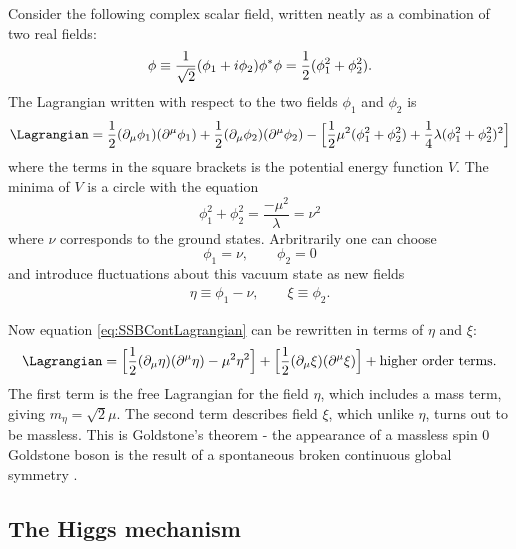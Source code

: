 Consider the following complex scalar field, written neatly as a combination of two real fields:
\begin{equation}
    \phi\equiv\dfrac{1}{\sqrt{2}}(\phi_1+i\phi_2)\\ \label{eq:complexfield}
    \phi^*\phi=\dfrac{1}{2}(\phi^2_1+\phi^2_2).
\end{equation}
The Lagrangian written with respect to the two fields $\phi_1$ and $\phi_2$ is
\begin{equation}\label{eq:SSBContLagrangian}
    \Lagrangian=\dfrac{1}{2}(\partial_{\mu}\phi_1)(\partial^{\mu}\phi_1) + \dfrac{1}{2}(\partial_{\mu}\phi_2)(\partial^{\mu}\phi_2) - \Big[\dfrac{1}{2}\mu^2(\phi_1^2+\phi_2^2)+\dfrac{1}{4}\lambda(\phi_1^2+\phi_2^2)^2\Big]
\end{equation}
where the terms in the square brackets is the potential energy function $V$. The minima of $V$ is a circle with the equation
\begin{equation}
    \phi_1^2+\phi_2^2=\dfrac{-\mu^2}{\lambda}=\nu^2
\end{equation}
where $\nu$ corresponds to the ground states. Arbritrarily one can choose
\begin{equation}
    \phi_1=\nu,\qquad\phi_2=0
\end{equation}
and introduce fluctuations about this vacuum state as new fields
\begin{align}\label{eq:etaxifields}
    \eta\equiv\phi_1-\nu,\qquad\xi\equiv\phi_2.
\end{align}

Now equation \ref{eq:SSBContLagrangian} can be rewritten in terms of $\eta$ and $\xi$:
\begin{equation}
    \Lagrangian=\Big[ \dfrac{1}{2}(\partial_{\mu}\eta)(\partial^{\mu}\eta) - \mu^2\eta^2 \Big] 
    + \Big[ \dfrac{1}{2}(\partial_{\mu}\xi)(\partial^{\mu}\xi) \Big] + \text{higher order terms.}
\end{equation}
The first term is the free Lagrangian for the field $\eta$, which includes a mass term, giving $m_{\eta}=\sqrt{2}\mu$. The second term describes field $\xi$, which unlike $\eta$, turns out to be massless. This is Goldstone's theorem - the appearance of a massless spin 0 Goldstone boson is the result of a spontaneous broken continuous global symmetry \cite{Griffiths:2008zz}. 

\subsection{The Higgs mechanism}

